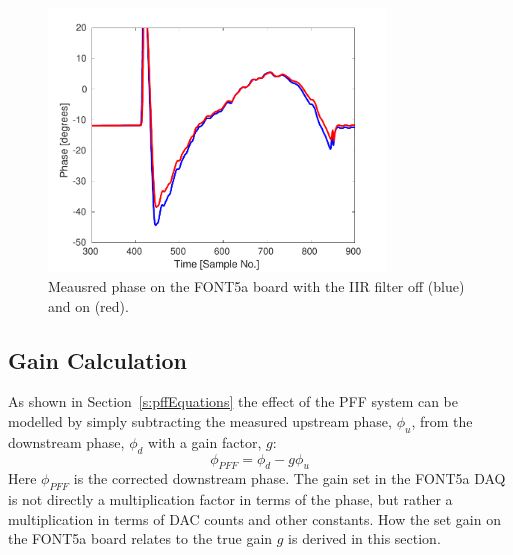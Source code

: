 \begin{figure}
  \centering
  \includegraphics[width=0.8\textwidth]{Figures/commissioning/iirPhaseFiltOffOn}
  \caption{Meausred phase on the FONT5a board with the IIR filter off (blue) and on (red).}
  \label{f:iirPhasefiltOffOn}
\end{figure}


\subsection{Gain Calculation}
\label{ss:fontGain}

As shown in Section~\ref{s:pffEquations} the effect of the PFF system can be modelled by simply subtracting the measured upstream phase, \(\phi_u\), from the downstream phase, \(\phi_d\) with a gain factor, \(g\):
\begin{equation} \label{e:realGainEqn}
\phi_{PFF} = \phi_d - g\phi_u
\end{equation}
Here \(\phi_{PFF}\) is the corrected downstream phase. The gain set in the FONT5a DAQ is not directly a multiplication factor in terms of the phase, but rather a multiplication in terms of DAC counts and other constants. How the set gain on the FONT5a board relates to the true gain \(g\) is derived in this section.

